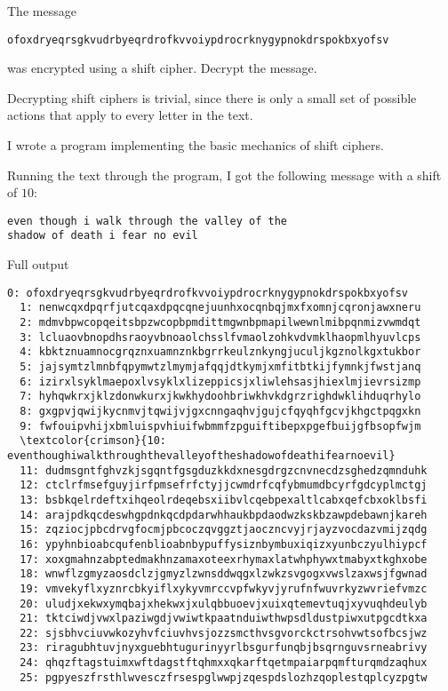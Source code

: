 \begin{problem}
The message 
\begin{center}
\texttt{ofoxdryeqrsgkvudrbyeqrdrofkvvoiypdrocrknygypnokdrspokbxyofsv}
\end{center}
was encrypted using a shift cipher.  Decrypt the message.
\end{problem}

\begin{Answer}

Decrypting shift ciphers is trivial, since there is only a small set of possible actions
that apply to every letter in the text.

\noindent
I wrote a program implementing the basic mechanics of shift ciphers.

\noindent
Running the text through the program,
  I got the following message with a shift of $10$:

\color{crimson}
\begin{verbatim}
even though i walk through the valley of the
shadow of death i fear no evil
\end{verbatim}

\color{black}
Full output

\begin{Verbatim}[commandchars=\\\{\}]
  0: ofoxdryeqrsgkvudrbyeqrdrofkvvoiypdrocrknygypnokdrspokbxyofsv
  1: nenwcqxdpqrfjutcqaxdpqcqnejuunhxocqnbqjmxfxomnjcqronjawxneru
  2: mdmvbpwcopqeitsbpzwcopbpmdittmgwnbpmapilwewnlmibpqnmizvwmdqt
  3: lcluaovbnopdhsraoyvbnoaolchsslfvmaolzohkvdvmklhaopmlhyuvlcps
  4: kbktznuamnocgrqznxuamnznkbgrrkeulznkyngjuculjkgznolkgxtukbor
  5: jajsymtzlmnbfqpymwtzlmymjafqqjdtkymjxmfitbtkijfymnkjfwstjanq
  6: izirxlsyklmaepoxlvsyklxlizeppicsjxliwlehsasjhiexlmjievrsizmp
  7: hyhqwkrxjklzdonwkurxjkwkhydoohbriwkhvkdgrzrighdwklihduqrhylo
  8: gxgpvjqwijkycnmvjtqwijvjgxcnngaqhvjgujcfqyqhfgcvjkhgctpqgxkn
  9: fwfouipvhijxbmluispvhiuifwbmmfzpguiftibepxpgefbuijgfbsopfwjm
  \textcolor{crimson}{10: eventhoughiwalkthroughthevalleyoftheshadowofdeathifearnoevil}
  11: dudmsgntfghvzkjsgqntfgsgduzkkdxnesgdrgzcnvnecdzsghedzqmnduhk
  12: ctclrfmsefguyjirfpmsefrfctyjjcwmdrfcqfybmumdbcyrfgdcyplmctgj
  13: bsbkqelrdeftxihqeolrdeqebsxiibvlcqebpexaltlcabxqefcbxoklbsfi
  14: arajpdkqcdeswhgpdnkqcdpdarwhhaukbpdaodwzkskbzawpdebawnjkareh
  15: zqziocjpbcdrvgfocmjpbcoczqvggztjaoczncvyjrjayzvocdazvmijzqdg
  16: ypyhnbioabcqufenblioabnbypuffysiznbymbuxiqizxyunbczyulhiypcf
  17: xoxgmahnzabptedmakhnzamaxoteexrhymaxlatwhphywxtmabyxtkghxobe
  18: wnwflzgmyzaosdclzjgmyzlzwnsddwqgxlzwkzsvgogxvwslzaxwsjfgwnad
  19: vmvekyflxyznrcbkyiflxykyvmrccvpfwkyvjyrufnfwuvrkyzwvriefvmzc
  20: uludjxekwxymqbajxhekwxjxulqbbuoevjxuixqtemevtuqjxyvuqhdeulyb
  21: tktciwdjvwxlpaziwgdjvwiwtkpaatnduiwthwpsdldustpiwxutpgcdtkxa
  22: sjsbhvciuvwkozyhvfciuvhvsjozzsmcthvsgvorckctrsohvwtsofbcsjwz
  23: riragubhtuvjnyxguebhtugurinyyrlbsgurfunqbjbsqrnguvsrneabrivy
  24: qhqzftagstuimxwftdagstftqhmxxqkarftqetmpaiarpqmfturqmdzaqhux
  25: pgpyeszfrsthlwvesczfrsespglwwpjzqespdslozhzqoplestqplcyzpgtw
\end{Verbatim}
\end{Answer}
